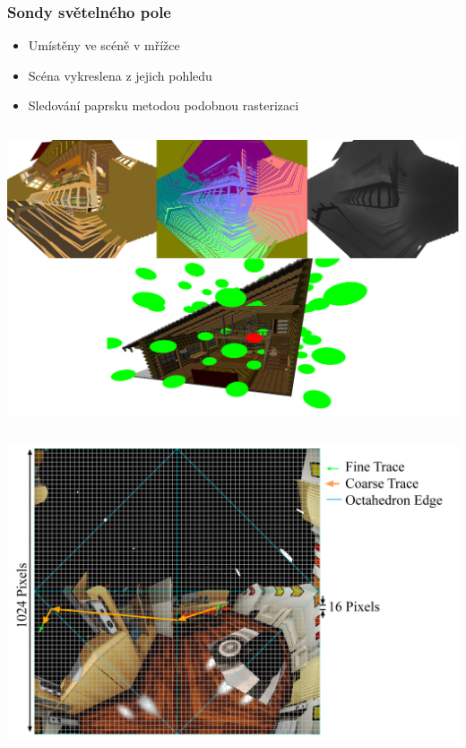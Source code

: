 \documentclass[10pt,xcolor=pdflatex,hyperref={unicode},aspectratio=169]{beamer}
\begin{document}
\begin{frame}\frametitle{Sondy světelného pole}
    \begin{itemize}
        \item Umístěny ve scéně v mřížce
        \item Scéna vykreslena z jejich pohledu
        \item Sledování paprsku metodou podobnou rasterizaci
    \end{itemize}
    \begin{column}{0.5\textwidth}
        \includegraphics[width=\textwidth]{img/probe_with_scene.png}
    \end{column}
    \begin{column}{0.5\textwidth}
        \includegraphics[width=\textwidth]{img/lfp_trace.png}
    \end{column}
\end{frame}
\end{document}
